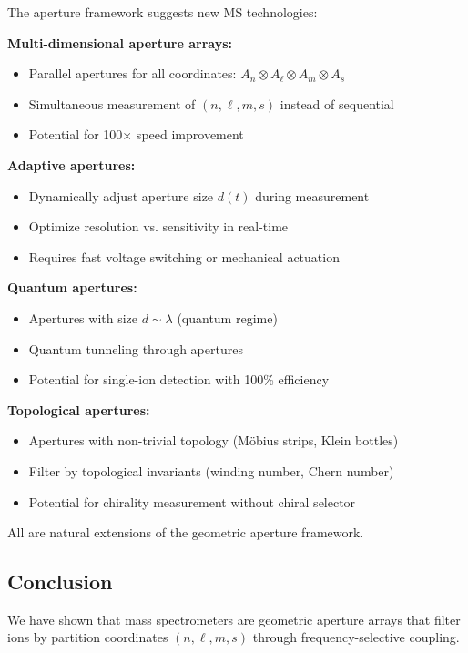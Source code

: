 The aperture framework suggests new MS technologies:

\textbf{Multi-dimensional aperture arrays:}
\begin{itemize}
    \item Parallel apertures for all coordinates: $A_n \otimes A_\ell \otimes A_m \otimes A_s$
    \item Simultaneous measurement of $(n,\ell,m,s)$ instead of sequential
    \item Potential for 100× speed improvement
\end{itemize}

\textbf{Adaptive apertures:}
\begin{itemize}
    \item Dynamically adjust aperture size $d(t)$ during measurement
    \item Optimize resolution vs. sensitivity in real-time
    \item Requires fast voltage switching or mechanical actuation
\end{itemize}

\textbf{Quantum apertures:}
\begin{itemize}
    \item Apertures with size $d \sim \lambda$ (quantum regime)
    \item Quantum tunneling through apertures
    \item Potential for single-ion detection with 100\% efficiency
\end{itemize}

\textbf{Topological apertures:}
\begin{itemize}
    \item Apertures with non-trivial topology (Möbius strips, Klein bottles)
    \item Filter by topological invariants (winding number, Chern number)
    \item Potential for chirality measurement without chiral selector
\end{itemize}

All are natural extensions of the geometric aperture framework.

\subsection{Conclusion}

We have shown that mass spectrometers are geometric aperture arrays that filter ions by partition coordinates $(n,\ell,m,s)$ through frequency-selective coupling.

